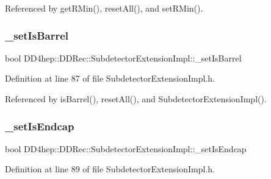 Referenced by get\+R\+Min(), reset\+All(), and set\+R\+Min().

\hypertarget{class_d_d4hep_1_1_d_d_rec_1_1_subdetector_extension_impl_a5044a5f0bffb6967aa75c1486d7e0403}{}\label{class_d_d4hep_1_1_d_d_rec_1_1_subdetector_extension_impl_a5044a5f0bffb6967aa75c1486d7e0403} 
\subsubsection{\texorpdfstring{\+\_\+set\+Is\+Barrel}{\_setIsBarrel}}
{\footnotesize\ttfamily bool D\+D4hep\+::\+D\+D\+Rec\+::\+Subdetector\+Extension\+Impl\+::\+\_\+set\+Is\+Barrel\hspace{0.3cm}{\ttfamily [protected]}}



Definition at line 87 of file Subdetector\+Extension\+Impl.\+h.



Referenced by is\+Barrel(), reset\+All(), and Subdetector\+Extension\+Impl().

\hypertarget{class_d_d4hep_1_1_d_d_rec_1_1_subdetector_extension_impl_ab96ac61e873d487a1837b4abe156869e}{}\label{class_d_d4hep_1_1_d_d_rec_1_1_subdetector_extension_impl_ab96ac61e873d487a1837b4abe156869e} 
\subsubsection{\texorpdfstring{\+\_\+set\+Is\+Endcap}{\_setIsEndcap}}
{\footnotesize\ttfamily bool D\+D4hep\+::\+D\+D\+Rec\+::\+Subdetector\+Extension\+Impl\+::\+\_\+set\+Is\+Endcap\hspace{0.3cm}{\ttfamily [protected]}}



Definition at line 89 of file Subdetector\+Extension\+Impl.\+h.



